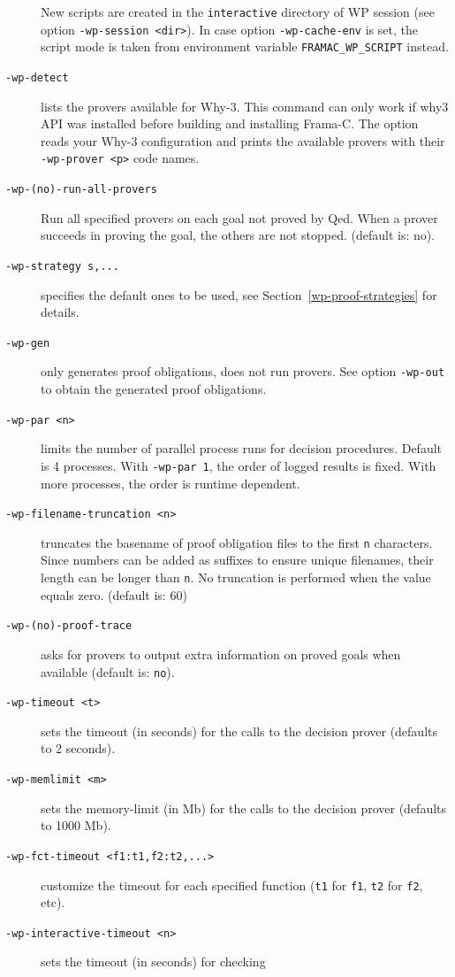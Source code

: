 \begin{description}
\begin{itemize}
  \end{itemize}
  New scripts are created in the \texttt{interactive} directory of \textsf{WP}
  session (see option \texttt{-wp-session <dir>}).
  In case option \verb|-wp-cache-env| is set, the script mode is taken from environment
  variable \verb|FRAMAC_WP_SCRIPT| instead.
\item[\tt -wp-detect] lists the provers available for \textsf{Why-3}.
  This command can only work if \textsf{why3} API was installed before building and
  installing \textsf{Frama-C}.
  The option reads your \textsf{Why-3} configuration and prints the available
  provers with their \verb+-wp-prover <p>+ code names.
\item[\tt -wp-(no)-run-all-provers] Run all specified provers on each goal not
  proved by Qed. When a prover succeeds in proving the goal, the others are not
  stopped. (default is: no).
\item[\tt -wp-strategy s,...] specifies the default
  ones to be used, see Section~\ref{wp-proof-strategies} for details.
\item[\tt -wp-gen] only generates proof obligations, does not run provers.
  See option \texttt{-wp-out} to obtain the generated proof obligations.
\item[\tt -wp-par <n>] limits the number of parallel process runs for
  decision procedures. Default is 4 processes. With
  \texttt{-wp-par~1}, the order of logged results is fixed. With more
  processes, the order is runtime dependent.
\item[\tt -wp-filename-truncation <n>] truncates the basename of proof
  obligation files to the first \texttt{n} characters.
  Since numbers can be added as suffixes to ensure unique filenames,
  their length can be longer than \texttt{n}.
  No truncation is performed when the value equals zero. (default is: 60)
\item[\tt -wp-(no)-proof-trace] asks for provers to output extra information
  on proved goals when available (default is: \texttt{no}).
\item[\tt -wp-timeout <t>] sets the timeout (in seconds) for the calls
  to the decision prover (defaults to 2 seconds).
\item[\tt -wp-memlimit <m>] sets the memory-limit (in Mb) for the calls
  to the decision prover (defaults to 1000 Mb).
\item[\tt -wp-fct-timeout <f1:t1,f2:t2,...>] customize the timeout for each
  specified function (\texttt{t1} for \texttt{f1}, \texttt{t2} for \texttt{f2},
  etc).
\item[\tt -wp-interactive-timeout <n>] sets the timeout (in seconds) for checking

\end{description}
